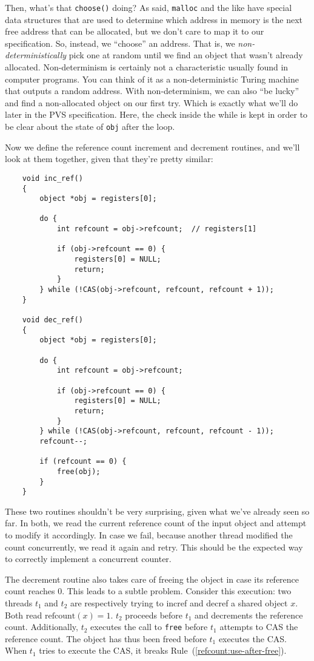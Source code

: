 Then, what's that \texttt{choose()} doing?
As said, \texttt{malloc} and the like have special data structures that are used to determine which address in memory is the next free address that can be allocated, but we don't care to map it to our specification.
So, instead, we ``choose'' an address.
That is, we \emph{non-deterministically} pick one at random until we find an object that wasn't already allocated.
Non-determinism is certainly not a characteristic usually found in computer programs.
You can think of it as a non-deterministic Turing machine that outputs a random address.
With non-determinism, we can also ``be lucky'' and find a non-allocated object on our first try.
Which is exactly what we'll do later in the PVS specification.
Here, the check inside the while is kept in order to be clear about the state of \texttt{obj} after the loop.

Now we define the reference count increment and decrement routines, and we'll look at them together, given that they're pretty similar:
\begin{verbatim}
	void inc_ref()
	{
	    object *obj = registers[0];

	    do {
	        int refcount = obj->refcount;  // registers[1]

	        if (obj->refcount == 0) {
	            registers[0] = NULL;
	            return;
	        }
	    } while (!CAS(obj->refcount, refcount, refcount + 1));
	}

	void dec_ref()
	{
	    object *obj = registers[0];

	    do {
	        int refcount = obj->refcount;

	        if (obj->refcount == 0) {
	            registers[0] = NULL;
	            return;
	        }
	    } while (!CAS(obj->refcount, refcount, refcount - 1));
	    refcount--;

	    if (refcount == 0) {
	        free(obj);
	    }
	}
\end{verbatim}

These two routines shouldn't be very surprising, given what we've already seen so far.
In both, we read the current reference count of the input object and attempt to modify it accordingly.
In case we fail, because another thread modified the count concurrently, we read it again and retry.
This should be the expected way to correctly implement a concurrent counter.

The decrement routine also takes care of freeing the object in case its reference count reaches 0.
This leads to a subtle problem.
Consider this execution: two threads $t_1$ and $t_2$ are respectively trying to incref and decref a shared object $x$.
Both read $\mathrm{refcount}(x) = 1$.
$t_2$ proceeds before $t_1$ and decrements the reference count.
Additionally, $t_2$ executes the call to \texttt{free} before $t_1$ attempts to CAS the reference count.
The object has thus been freed before $t_1$ executes the CAS\@.
When $t_1$ tries to execute the CAS, it breaks Rule~(\ref{refcount:use-after-free}).

